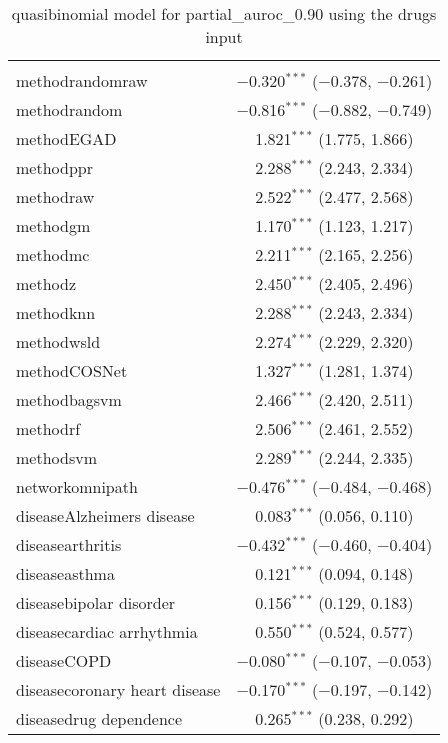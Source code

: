 
\begin{table}[!htbp] \centering 
  \caption{quasibinomial model for partial_auroc_0.90 using the drugs input} 
  \label{} 
\begin{tabular}{@{\extracolsep{5pt}}lc} 
\\[-1.8ex]\hline 
\hline \\[-1.8ex] 
 methodrandomraw & $-$0.320$^{***}$ ($-$0.378, $-$0.261) \\ 
  methodrandom & $-$0.816$^{***}$ ($-$0.882, $-$0.749) \\ 
  methodEGAD & 1.821$^{***}$ (1.775, 1.866) \\ 
  methodppr & 2.288$^{***}$ (2.243, 2.334) \\ 
  methodraw & 2.522$^{***}$ (2.477, 2.568) \\ 
  methodgm & 1.170$^{***}$ (1.123, 1.217) \\ 
  methodmc & 2.211$^{***}$ (2.165, 2.256) \\ 
  methodz & 2.450$^{***}$ (2.405, 2.496) \\ 
  methodknn & 2.288$^{***}$ (2.243, 2.334) \\ 
  methodwsld & 2.274$^{***}$ (2.229, 2.320) \\ 
  methodCOSNet & 1.327$^{***}$ (1.281, 1.374) \\ 
  methodbagsvm & 2.466$^{***}$ (2.420, 2.511) \\ 
  methodrf & 2.506$^{***}$ (2.461, 2.552) \\ 
  methodsvm & 2.289$^{***}$ (2.244, 2.335) \\ 
  networkomnipath & $-$0.476$^{***}$ ($-$0.484, $-$0.468) \\ 
  diseaseAlzheimers disease & 0.083$^{***}$ (0.056, 0.110) \\ 
  diseasearthritis & $-$0.432$^{***}$ ($-$0.460, $-$0.404) \\ 
  diseaseasthma & 0.121$^{***}$ (0.094, 0.148) \\ 
  diseasebipolar disorder & 0.156$^{***}$ (0.129, 0.183) \\ 
  diseasecardiac arrhythmia & 0.550$^{***}$ (0.524, 0.577) \\ 
  diseaseCOPD & $-$0.080$^{***}$ ($-$0.107, $-$0.053) \\ 
  diseasecoronary heart disease & $-$0.170$^{***}$ ($-$0.197, $-$0.142) \\ 
  diseasedrug dependence & 0.265$^{***}$ (0.238, 0.292) \\ 

\end{tabular}
\end{table}
